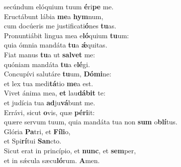 \evenverse secúndum elóquium tuum \textbf{é}ri\textbf{pe} me.\\
\oddverse Eructábunt lábia \textbf{me}a \textbf{hym}num,~\*\\
\oddverse cum docúeris me justificati\textbf{ó}nes \textbf{tu}as.\\
\evenverse Pronuntiábit lingua mea e\textbf{ló}quium \textbf{tu}um:~\*\\
\evenverse quia ómnia mandáta \textbf{tu}a \textbf{ǽ}quitas.\\
\oddverse Fiat manus \textbf{tu}a ut \textbf{sal}\textbf{vet} me:~\*\\
\oddverse quóniam mandáta \textbf{tu}a e\textbf{lé}gi.\\
\evenverse Concupívi salutáre \textbf{tu}um, \textbf{Dó}\textbf{mi}ne:~\*\\
\evenverse et lex tua medi\textbf{tá}tio \textbf{me}a est.\\
\oddverse Vivet ánima mea, \textbf{et} lau\textbf{dá}\textbf{bit} te:~\*\\
\oddverse et judícia tua \textbf{ad}ju\textbf{vá}bunt me.\\
\evenverse Errávi, sicut \textbf{o}vis, quæ \textbf{pé}\textbf{ri}it:~\*\\
\evenverse quære servum tuum, quia mandáta tua non \textbf{sum} o\textbf{blí}tus.\\
\oddverse Glória \textbf{Pa}tri, et \textbf{Fí}\textbf{li}o,~\*\\
\oddverse et Spi\textbf{rí}tui \textbf{San}cto.\\
\evenverse Sicut erat in princípio, et \textbf{nunc}, et \textbf{sem}per,~\*\\
\evenverse et in sǽcula sæcu\textbf{ló}rum. \textbf{A}men.\\

